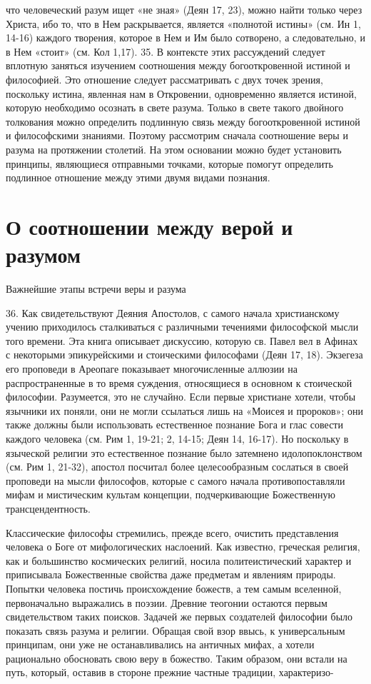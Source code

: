 \documentclass[a5paper,10pt]{article}
\begin{document}
что человеческий разум ищет «не зная» (Деян 17, 23), можно найти только через
Христа, ибо то, что в Нем раскрывается, является «полнотой истины» (см. Ин 1,
14-16) каждого творения, которое в Нем и Им было сотворено, а следовательно, и
в Нем «стоит» (см. Кол 1,17). 35. В контексте этих рассуждений следует вплотную
заняться изучением соотношения между богооткровенной истиной и философией. Это
отношение следует рассматривать с двух точек зрения, поскольку истина, явленная
нам в Откровении, одновременно является истиной, которую необходимо осознать в
свете разума.  Только в свете такого двойного толкования можно определить
подлинную связь между богооткровенной истиной и философскими знаниями. Поэтому
рассмотрим сначала соотношение веры и разума на протяжении столетий. На этом
основании можно будет установить принципы, являющиеся отправными точками,
которые помогут определить подлинное отношение между этими двумя видами
познания.

\section{О соотношении между верой и разумом}

Важнейшие этапы встречи веры и разума

36. Как свидетельствуют Деяния Апостолов, с самого начала христианскому учению
приходилось сталкиваться с различными течениями философской мысли того времени.
Эта книга описывает дискуссию, которую св. Павел вел в Афинах с некоторыми
эпикурейскими и стоическими философами (Деян 17, 18). Экзегеза его проповеди в
Ареопаге показывает многочисленные аллюзии на распространенные в то время
суждения, относящиеся в основном к стоической философии. Разумеется, это не
случайно. Если первые христиане хотели, чтобы язычники их поняли, они не могли
ссылаться лишь на «Моисея и пророков»; они также должны были использовать
естественное познание Бога и глас совести каждого человека (см. Рим 1, 19-21;
2, 14-15; Деян 14, 16-17). Но поскольку в языческой религии это естественное
познание было затемнено идолопоклонством (см. Рим 1, 21-32), апостол посчитал
более целесообразным сослаться в своей проповеди на мысли философов, которые с
самого начала противопоставляли мифам и мистическим культам концепции,
подчеркивающие Божественную трансцендентность.

Классические философы стремились, прежде всего, очистить представления человека
о Боге от мифологических наслоений. Как известно, греческая религия, как и
большинство космических религий, носила политеистический характер и приписывала
Божественные свойства даже предметам и явлениям природы. Попытки человека
постичь происхождение божеств, а тем самым вселенной, первоначально выражались
в поэзии. Древние теогонии остаются первым свидетельством таких поисков.
Задачей же первых создателей философии было показать связь разума и религии.
Обращая свой взор ввысь, к универсальным принципам, они уже не останавливались
на античных мифах, а хотели рационально обосновать свою веру в божество. Таким
образом, они встали на путь, который, оставив в стороне прежние частные
традиции, характеризо-
\end{document}

